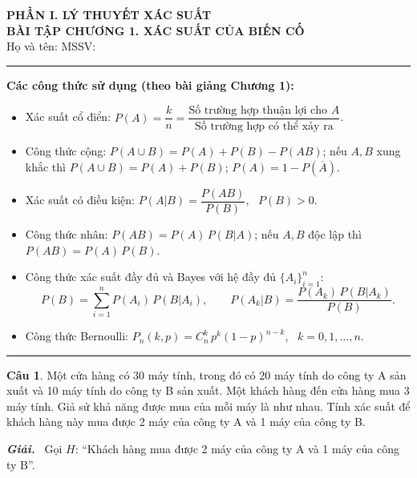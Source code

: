 \documentclass[12pt,a4paper]{article}
\theoremstyle{definition}
\newtheorem{cau}{Câu}
\newcommand{\giai}{\noindent\textbf{\textit{Giải.}}\ }
\begin{document}
\begin{center}
    {\large \textbf{PHẦN I. LÝ THUYẾT XÁC SUẤT}}\\[0.3em]
    {\LARGE \textbf{BÀI TẬP CHƯƠNG 1. XÁC SUẤT CỦA BIẾN CỐ}}\\[0.8em]
    {\normalsize Họ và tên: \dotfill\quad MSSV: \dotfill}
\end{center}

\vspace{0.5em}
\hrule
\vspace{1em}

\noindent\textbf{Các công thức sử dụng (theo bài giảng Chương 1):}
\begin{itemize}[leftmargin=1.5em]
    \item Xác suất cổ điển: $P(A) = \dfrac{k}{n} = \dfrac{\text{Số trường hợp thuận lợi cho } A}{\text{Số trường hợp có thể xảy ra}}$.
    \item Công thức cộng: $P(A \cup B) = P(A) + P(B) - P(AB)$; nếu $A, B$ xung khắc thì $P(A \cup B) = P(A) + P(B)$; $P(A) = 1 - P(\overline{A})$.
    \item Xác suất có điều kiện: $P(A|B) = \dfrac{P(AB)}{P(B)}$, \ $P(B) > 0$.
    \item Công thức nhân: $P(AB) = P(A)\,P(B|A)$; nếu $A, B$ độc lập thì $P(AB) = P(A)\,P(B)$.
    \item Công thức xác suất đầy đủ và Bayes với hệ đầy đủ $\{A_i\}_{i=1}^n$:
    \[
    P(B) = \sum_{i=1}^n P(A_i)\,P(B|A_i), \qquad P(A_k|B) = \frac{P(A_k)\,P(B|A_k)}{P(B)}.
    \]
    \item Công thức Bernoulli: $P_n(k, p) = C_n^k\, p^k (1-p)^{n-k}$, \ $k = 0, 1, \dots, n$.
\end{itemize}

\vspace{0.5em}
\hrule
\vspace{1em}

\begin{cau}
Một cửa hàng có 30 máy tính, trong đó có 20 máy tính do công ty A sản xuất và 10 máy tính do công ty B sản xuất. Một khách hàng đến cửa hàng mua 3 máy tính. Giả sử khả năng được mua của mỗi máy là như nhau. Tính xác suất để khách hàng này mua được 2 máy của công ty A và 1 máy của công ty B.
\end{cau}

\giai
Gọi $H$: ``Khách hàng mua được 2 máy của công ty A và 1 máy của công ty B''.
\end{document}
